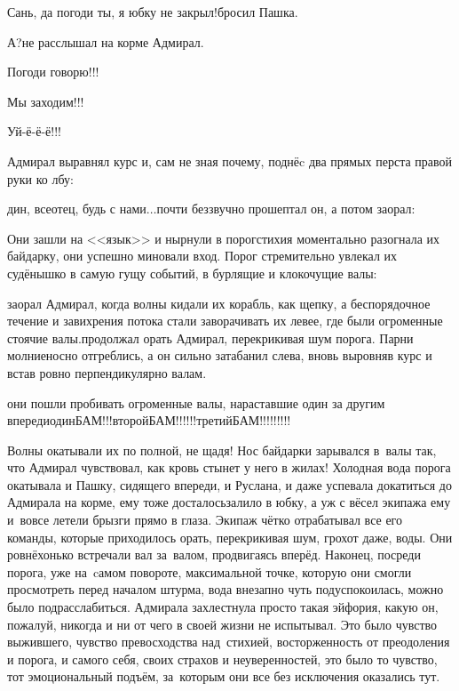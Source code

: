 \diagdash Сань, да погоди ты, я юбку не закрыл!\mdash бросил Пашка.

\diagdash А?\mdash не расслышал на корме Адмирал.

\diagdash Погоди говорю!!!

\diagdash Мы заходим!!!

\diagdash Уй-ё-ё-ё!!!

Адмирал выравнял курс и, сам не зная почему, поднёc два прямых перста правой руки ко лбу:

дин, всеотец, будь с нами$\ldots$\mdash почти беззвучно прошептал он, а потом заорал:

Они зашли на <<язык>> и нырнули в порог\mdash стихия моментально разогнала их байдарку, они успешно миновали вход. Порог стремительно увлекал их судёнышко в самую гущу событий, в бурлящие и клокочущие валы:

\mdash заорал Адмирал, когда волны кидали их корабль, как щепку, а беспорядочное течение и завихрения потока стали заворачивать их левее, где были огроменные стоячие валы.\mdash продолжал орать Адмирал, перекрикивая шум порога. Парни молниеносно отгреблись, а он сильно затабанил слева, вновь выровняв курс и встав ровно перпендикулярно валам. 

\mdash они пошли пробивать огроменные валы, нараставшие один за другим впереди\mdash один\mdash БАМ!!!\mdash второй\mdash БАМ!!!!!!\mdash третий\mdash БАМ!!!!!!!!!

Волны окатывали их по полной, не щадя! Нос байдарки зарывался в~валы так, что Адмирал чувствовал, как кровь стынет у него в жилах! Холодная вода порога окатывала и Пашку, сидящего впереди, и Руслана, и даже успевала докатиться до Адмирала на корме, ему тоже досталось\mdash залило в юбку, а уж с вёсел экипажа ему и~вовсе летели брызги прямо в глаза. Экипаж чётко отрабатывал все его команды, которые приходилось орать, перекрикивая шум, грохот даже, воды. Они ровнёхонько встречали вал за~валом, продвигаясь вперёд. Наконец, посреди порога, уже на~cамом повороте, максимальной точке, которую они смогли просмотреть перед началом штурма, вода внезапно чуть подуспокоилась, можно было подрасслабиться. Адмирала захлестнула просто такая эйфория, какую он, пожалуй, никогда и ни от чего в своей жизни не испытывал. Это было чувство выжившего, чувство превосходства над~стихией, восторженность от преодоления и порога, и самого себя, своих страхов и неуверенностей, это было то чувство, тот эмоциональный подъём, за~которым они все без исключения оказались тут. 

